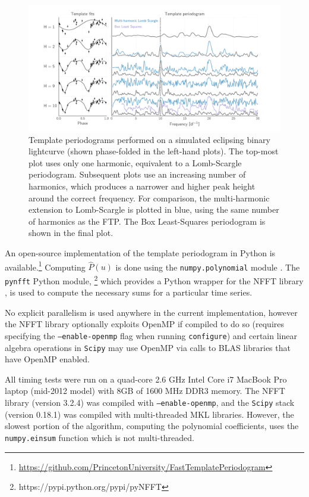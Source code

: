 \documentclass[apj]{emulateapj}
\begin{document}
\begin{figure}
    \centering
    \includegraphics[width=\textwidth]{plots/templates_and_periodograms.pdf}
    \caption{\label{fig:tempsandpdgs} Template periodograms performed on a simulated eclipsing
            binary lightcurve (shown phase-folded in the left-hand plots). The top-most plot 
            uses only one harmonic, equivalent to a Lomb-Scargle periodogram. Subsequent plots
            use an increasing number of harmonics, which produces a narrower and higher peak
            height around the correct frequency. For comparison, the multi-harmonic extension 
            to Lomb-Scargle is plotted in blue, using the same number of harmonics as the FTP.
            The Box Least-Squares \citep{Kovacs_2002} periodogram is shown in the final plot.}
\end{figure}

An open-source implementation of the template periodogram in Python is
available.\footnote{\url{https://github.com/PrincetonUniversity/FastTemplatePeriodogram}} 
Computing $\hat{P}(u)$ is done using the \texttt{numpy.polynomial} module 
\citep{Scipy}. The \texttt{pynfft} Python module,
\footnote{https://pypi.python.org/pypi/pyNFFT} which provides a Python 
wrapper for the NFFT library \citep{NFFT}, is used to compute the necessary 
sums for a particular time series.

No explicit parallelism is used anywhere in the current implementation, 
however the NFFT library optionally exploits OpenMP if compiled
to do so (requires specifying the \texttt{--enable-openmp} flag
when running \texttt{configure}) and certain linear algebra operations
in \texttt{Scipy} may use OpenMP via calls to BLAS libraries that
have OpenMP enabled.

All timing tests were run on a quad-core 2.6 GHz Intel Core i7 MacBook 
Pro laptop (mid-2012 model) with 8GB of 1600 MHz DDR3 memory. The NFFT
library (version 3.2.4) was compiled with \texttt{--enable-openmp}, and
the \texttt{Scipy} stack (version 0.18.1) was compiled with multi-threaded MKL libraries.
However, the slowest portion of the algorithm, computing the polynomial
coefficients, uses the \texttt{numpy.einsum} function which is not
multi-threaded. 
\end{document}
